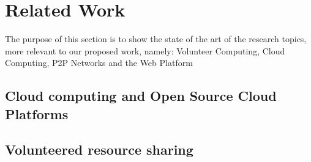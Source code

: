 \documentclass{./llncs2e/llncs}
\begin{document}

% 
% 

\section{Related Work}
The purpose of this section is to show the state of the art of the research topics, more relevant to our proposed work, namely: Volunteer Computing, Cloud Computing, P2P Networks and the Web Platform

% 
% 
\subsection{Cloud computing and Open Source Cloud Platforms}
%  














% 
% 
\subsection{Volunteered resource sharing}



% 
        
\end{document}
